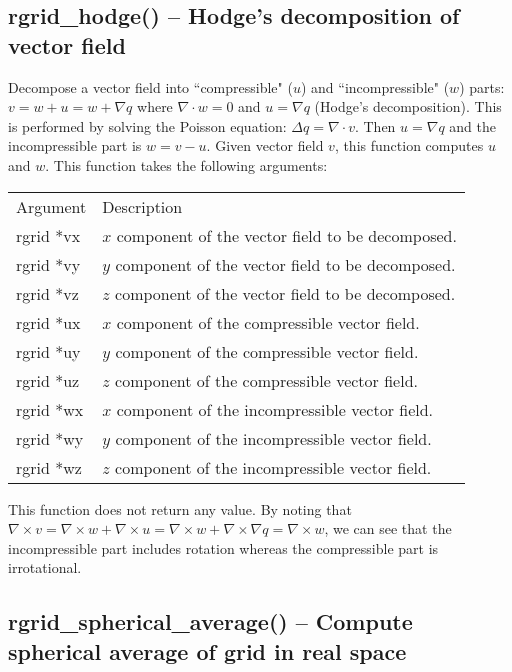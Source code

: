 \documentclass[12pt,letterpaper]{report}
\begin{document}
\subsection{rgrid\_hodge() -- Hodge's decomposition of vector field}

Decompose a vector field into ``compressible" ($u$) and ``incompressible" ($w$) parts: $v = w + u = w + \nabla q$ where $\nabla\cdot w = 0$ and $u = \nabla q$ (Hodge's decomposition). This is performed by solving the Poisson equation: $\Delta q = \nabla\cdot v$. Then $u = \nabla q$ and the incompressible part is $w = v - u$. Given vector field $v$, this function computes $u$ and $w$. This function takes the following arguments:
\begin{longtable}{p{} p{}}
Argument & Description\\
\cline{1-2}
rgrid *vx & $x$ component of the vector field to be decomposed.\\
rgrid *vy & $y$ component of the vector field to be decomposed.\\
rgrid *vz & $z$ component of the vector field to be decomposed.\\
rgrid *ux & $x$ component of the compressible vector field.\\
rgrid *uy & $y$ component of the compressible vector field.\\
rgrid *uz & $z$ component of the compressible vector field.\\
rgrid *wx & $x$ component of the incompressible vector field.\\
rgrid *wy & $y$ component of the incompressible vector field.\\
rgrid *wz & $z$ component of the incompressible vector field.\\
\end{longtable}
\noindent
This function does not return any value. By noting that $\nabla\times v = \nabla\times w + \nabla\times u = \nabla\times w + \nabla\times\nabla q = \nabla\times w$, we can see that the incompressible part includes rotation whereas the compressible part is irrotational.

\subsection{rgrid\_spherical\_average() -- Compute spherical average of grid in real space}
\end{document}
